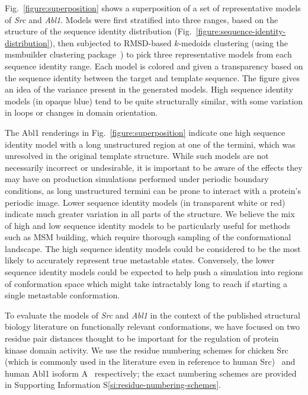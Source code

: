 \documentclass[aps,pre,twocolumn,nofootinbib,superscriptaddress,linenumbers]{revtex4-1}
\begin{document}
Fig.~\ref{figure:superposition} shows a superposition of a set of representative models of \emph{Src} and \emph{Abl1}.
Models were first stratified into three ranges, based on the structure of the sequence identity distribution (Fig.~\ref{figure:sequence-identity-distribution}), then subjected to RMSD-based $k$-medoids clustering (using the msmbuilder clustering package~\cite{msmbuilder}) to pick three representative models from each sequence identity range.
Each model is colored and given a transparency based on the sequence identity between the target and template sequence.
The figure gives an idea of the variance present in the generated models.
High sequence identity models (in opaque blue) tend to be quite structurally similar, with some variation in loops or changes in domain orientation.

The Abl1 renderings in Fig.~\ref{figure:superposition} indicate one high sequence identity model with a long unstructured region at one of the termini, which was unresolved in the original template structure.
While such models are not necessarily incorrect or undesirable, it is important to be aware of the effects they may have on production simulations performed under periodic boundary conditions, as long unstructured termini can be prone to interact with a protein's periodic image.
Lower sequence identity models (in transparent white or red) indicate much greater variation in all parts of the structure.
We believe the mix of high and low sequence identity models to be particularly useful for methods such as MSM building, which require thorough sampling of the conformational landscape.
The high sequence identity models could be considered to be the most likely to accurately represent true metastable states.
Conversely, the lower sequence identity models could be expected to help push a simulation into regions of conformation space which might take intractably long to reach if starting a single metastable conformation.

To evaluate the models of \emph{Src} and \emph{Abl1} in the context of the published structural biology literature on functionally relevant conformations, we have focused on two residue pair distances thought to be important for the regulation of protein kinase domain activity.
We use the residue numbering schemes for chicken Src (which is commonly used in the literature even in reference to human Src)~\cite{xu:1999:2src, cowan-jacob:2005:1y57} and human Abl1 isoform A~\cite{young:2006:2f4j, cowan-jacob:2006:2hyy, levinson:2006:2g1t} respectively; the exact numbering schemes are provided in Supporting Information S\ref{si:residue-numbering-schemes}.
\end{document}
